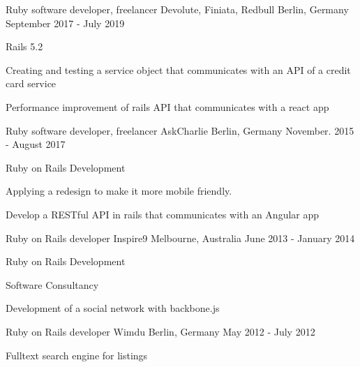 \begin{cventries}
  \cventry
    {Ruby software developer, freelancer} %
    {Devolute, Finiata, Redbull} %
    {Berlin, Germany} %
    {September 2017 - July 2019} %
    {
      \begin{cvitems} %
        \item { Rails 5.2 }
        \item { Creating and testing a service object that communicates with an API of a credit card service }
        \item { Performance improvement of rails API that communicates with a react app }
      \end{cvitems}
    }

  \cventry
    {Ruby software developer, freelancer} %
    {AskCharlie} %
    {Berlin, Germany} %
    {November. 2015 - August 2017} %
    {
      \begin{cvitems} %
        \item {Ruby on Rails Development}
        \item {Applying a redesign to make it more mobile friendly.}
        \item {Develop a RESTful API in rails that communicates with an Angular app}
      \end{cvitems}
    }

  \cventry
    {Ruby on Rails developer} %
    {Inspire9} %
    {Melbourne, Australia} %
    {June 2013 - January 2014} %
    {
      \begin{cvitems} %
        \item {Ruby on Rails Development}
        \item {Software Consultancy}
        \item {Development of a social network with backbone.js}
      \end{cvitems}
    }

  \cventry
    {Ruby on Rails developer} %
    {Wimdu} %
    {Berlin, Germany} %
    {May 2012 - July 2012} %
    {
      \begin{cvitems} %
        \item {Fulltext search engine for listings}
      \end{cvitems}
    }


\end{cventries}
